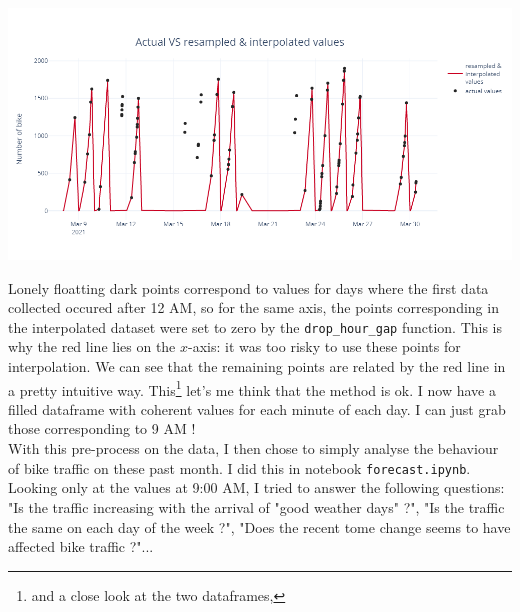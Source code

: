 \documentclass[11pt,a4paper]{article}
\begin{document}
\begin{itemize}
\begin{center}
\includegraphics[scale=0.35]{resamp_interp.png}
\end{center}


Lonely floatting dark points correspond to values for days where the first data collected occured after 12 AM, so for the same axis, the points corresponding in the interpolated dataset were set to zero by the \texttt{drop\_hour\_gap} function. This is why the red line lies on the $x$-axis: it was too risky to use these points for interpolation. We can see that the remaining points are related by the red line in a pretty intuitive way. This\footnote{and a close look at the two dataframes,} let's me think that the method is ok. I now have a filled dataframe with coherent values for each minute of each day. I can just grab those corresponding to 9 AM !\\

With this pre-process on the data, I then chose to simply analyse the behaviour of bike traffic on these past month. I did this in notebook \texttt{forecast.ipynb}. Looking only at the values at 9:00 AM, I tried to answer the following questions: "Is the traffic increasing with the arrival of "good weather days" ?", "Is the traffic the same on each day of the week ?", "Does the recent tome change seems to have affected bike traffic ?"...

\end{itemize}
\end{document}
